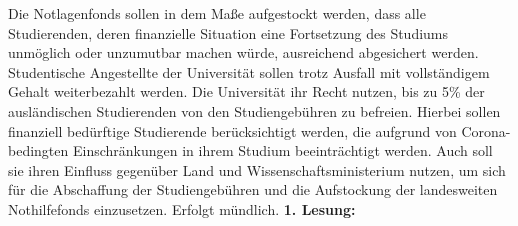     {
        Die Notlagenfonds sollen in dem Maße aufgestockt werden, dass alle Studierenden,
        deren
        finanzielle Situation eine Fortsetzung des Studiums unmöglich oder unzumutbar machen
        würde,
        ausreichend abgesichert werden. Studentische Angestellte der Universität sollen trotz
        Ausfall mit
        vollständigem Gehalt weiterbezahlt werden.
        Die Universität ihr Recht nutzen, bis zu 5\% der ausländischen Studierenden von den
        Studiengebühren zu befreien. Hierbei sollen finanziell bedürftige Studierende
        berücksichtigt
        werden, die aufgrund von Corona-bedingten Einschränkungen in ihrem Studium
        beeinträchtigt
        werden. Auch soll sie ihren Einfluss gegenüber Land und Wissenschaftsministerium
        nutzen, um
        sich für die Abschaffung der Studiengebühren und die Aufstockung der landesweiten
        Nothilfefonds
        einzusetzen.
    }{
        Erfolgt mündlich.
    }{
        \textbf{1. Lesung:}
        \ul{}
    }{
    }
